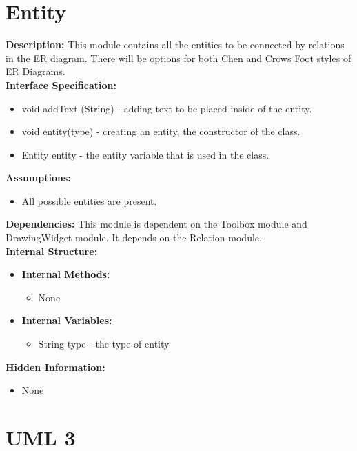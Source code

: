 \chapter{Entity}
\textbf{Description:} This module contains all the entities to be connected by relations in the ER diagram. There will be options for both Chen and Crows Foot styles of ER Diagrams. \\
\textbf{Interface Specification:}
\begin{itemize}
\item{void addText (String) - adding text to be placed inside of the entity.}
\item{void entity(type) - creating an entity, the constructor of the class.} 
\item{Entity entity - the entity variable that is used in the class.}
\end{itemize}
\textbf{Assumptions:}
\begin{itemize}
\item{All possible entities are present.}
\end{itemize}
\textbf{Dependencies:} This module is dependent on the Toolbox module and DrawingWidget module. It depends on the Relation module. \\
\textbf{Internal Structure:}
\begin{itemize}
        	\item{\textbf{Internal Methods:} 
        	\begin{itemize}
        	\item{None}
        	\end{itemize}}
        	\item{\textbf{Internal Variables:} 
        	\begin{itemize}
        	\item{String type - the type of entity}
        	\end{itemize}}
\end{itemize}
\textbf{Hidden Information:}
\begin{itemize}
\item{None} 
\end{itemize}








\chapter{UML 3}


